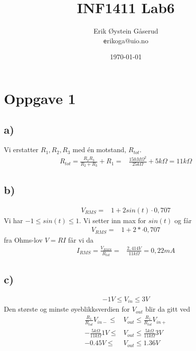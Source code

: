 \documentclass[11pt]{article}
\title{INF1411 Lab6}
\author{Erik Øystein Gåserud \\
\texttt erikoga@uio.no}
\date{\today}
\begin{document}
\maketitle

\section*{Oppgave 1}

\subsection*{a)}

Vi erstatter $R_{1}, R_{2}, R_{3}$ med én motstand, $R_{tot}$. \\
\begin{align*}
R_{tot} = \frac{R_{2}R_{3}}{R_{2}+R_{3}} + R_{1} =& \frac{150M\Omega^2}{25k\Omega}+ 5k\Omega = 11k\Omega
\end{align*}

\subsection*{b)}

\begin{align*}
V_{RMS} =& 1+2sin(t)\cdot0,707
\end{align*}
Vi har $-1 \leq sin(t) \leq 1$. Vi setter inn max for $sin(t)$ og får
\begin{align*}
V_{RMS} =& 1+2*\cdot0,707
\end{align*}
fra Ohms-lov $V=RI$ får vi da
\begin{align*}
I_{RMS} = \frac{V_{RMS}}{R_{tot}} =& \frac{2,414V}{11k\Omega} = 0,22mA
\end{align*}

\subsection*{c)}

\begin{align*}
-1V \leq V_{in} \leq 3V
\end{align*}
Den største og minste øyeblikksverdien for $V_{out}$ blir da gitt ved
\begin{align*}
\frac{R_{1}}{R_{tot}}V_{in-} \leq &V_{out} \leq \frac{R_{1}}{R_{tot}}V_{in+} \\
-\frac{5k\Omega}{11k\Omega}1V \leq &V_{out} \leq \frac{5k\Omega}{11k\Omega}3V \\
-0.45V \leq &V_{out} \leq 1.36V
\end{align*}
\end{document}
